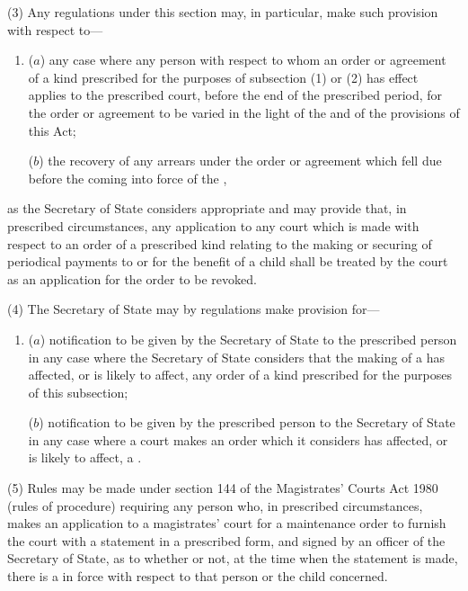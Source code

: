 \documentclass[a4paper]{article}
\begin{document}
(3)
Any regulations under this section may, in particular, make such provision
with respect to---
\begin{enumerate}\item[]
($a$)
any case where any person with respect to whom an order or agreement
of a kind prescribed for the purposes of subsection (1) or (2) has effect
applies to the prescribed court, before the end of the prescribed period,
for the order or agreement to be varied in the light of the 
and of the provisions of this Act;

($b$)
the recovery of any arrears under the order or agreement which fell due
before the coming into force of the ,
\end{enumerate}
as the Secretary of State considers appropriate and may provide that, in prescribed
circumstances, any application to any court which is made with respect to an order
of a prescribed kind relating to the making or securing of periodical payments to
or for the benefit of a child shall be treated by the court as an application for the
order to be revoked.

(4)
The Secretary of State may by regulations make provision for---
\begin{enumerate}\item[]
($a$)
notification to be given by 
the 
Secretary of State to the prescribed person
in any case where the Secretary of State considers that the making of a
has affected, or is likely
to affect, any order of a kind prescribed for the purposes of this subsection;

($b$)
notification to be given by the prescribed person to the Secretary of State
in any case where a court makes an order which it considers has affected,
or is likely to affect, a .
\end{enumerate}

(5) Rules may be made under section 144 of the Magistrates’ Courts Act 1980
(rules of procedure) requiring any person who, in prescribed circumstances, makes
an application to a magistrates’ court for a maintenance order to furnish the court
with a statement in a prescribed form, and signed by an officer of the Secretary of
State, as to whether or not, at the time when the statement is made, there is a
in force with respect to that person
or the child concerned.
\end{document}
